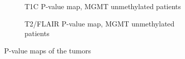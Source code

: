 \begin{subappendices}
\begin{figure}[H]
        \begin{subfigure}[t]{0.4\textwidth}
            \centering
            \caption{\gls{T1C} P-value map, \gls{MGMT} unmethylated patients}\label{fig:HGG_loc_T1_p_value_map_unmethylated}
        \end{subfigure}
        \begin{subfigure}[t]{0.4\textwidth}
            \centering
            \caption{\gls{T2}/\gls{FLAIR} P-value map, \gls{MGMT} unmethylated patients}\label{fig:HGG_loc_T2_p_value_map_unmethylated}
        \end{subfigure}
        \caption{P-value maps of the \glspl{tumor}}
    \end{figure}
\end{subappendices}

